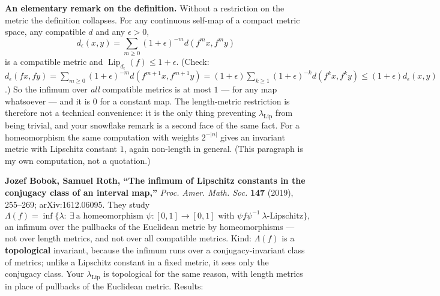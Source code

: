 \documentclass[
]{article}
\begin{document}
\textbf{An elementary remark on the definition.} Without a restriction
on the metric the definition collapses. For any continuous self-map of a
compact metric space, any compatible \(d\) and any \(\epsilon>0\), \[
d_\epsilon(x,y)=\sum_{m\ge0}(1+\epsilon)^{-m}d(f^mx,f^my)
\] is a compatible metric and
\(\operatorname{Lip}_{d_\epsilon}(f)\le 1+\epsilon\). (Check:
\(d_\epsilon(fx,fy)=\sum_{m\ge0}(1+\epsilon)^{-m}d(f^{m+1}x,f^{m+1}y)=(1+\epsilon)\sum_{k\ge1}(1+\epsilon)^{-k}d(f^kx,f^ky)\le(1+\epsilon)d_\epsilon(x,y)\).)
So the infimum over \emph{all} compatible metrics is at most \(1\) ---
for any map whatsoever --- and it is \(0\) for a constant map. The
length-metric restriction is therefore not a technical convenience: it
is the only thing preventing \(\lambda_{\mathrm{Lip}}\) from being
trivial, and your snowflake remark is a second face of the same fact.
For a homeomorphism the same computation with weights \(2^{-|n|}\) gives
an invariant metric with Lipschitz constant \(1\), again non-length in
general. (This paragraph is my own computation, not a quotation.)

\textbf{Jozef Bobok, Samuel Roth, ``The infimum of Lipschitz constants
in the conjugacy class of an interval map,''} \emph{Proc. Amer. Math.
Soc.} \textbf{147} (2019), 255--269; arXiv:1612.06095. They study \[
\Lambda(f)=\inf\{\lambda:\ \exists\ \text{a homeomorphism }\psi:[0,1]\to[0,1]\text{ with }\psi f\psi^{-1}\ \lambda\text{-Lipschitz}\},
\] an infimum over the pullbacks of the Euclidean metric by
homeomorphisms --- not over length metrics, and not over all compatible
metrics. Kind: \(\Lambda(f)\) is a \textbf{topological} invariant,
because the infimum runs over a conjugacy-invariant class of metrics;
unlike a Lipschitz constant in a fixed metric, it sees only the
conjugacy class. Your \(\lambda_{\mathrm{Lip}}\) is topological for the
same reason, with length metrics in place of pullbacks of the Euclidean
metric. Results:
\end{document}
